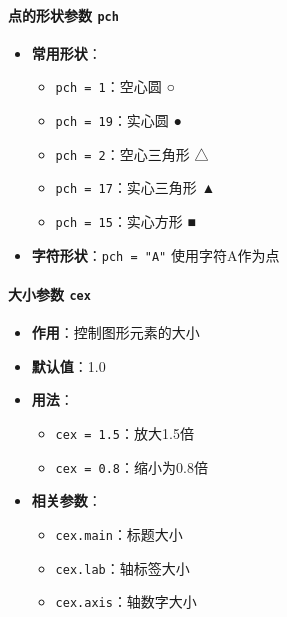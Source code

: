 \documentclass[
]{book}
\providecommand{\tightlist}{%
  \setlength{\itemsep}{0pt}\setlength{\parskip}{0pt}}
\begin{document}
\hypertarget{ux70b9ux7684ux5f62ux72b6ux53c2ux6570-pch}{%
\paragraph{\texorpdfstring{点的形状参数 \texttt{pch}}{点的形状参数 pch}}\label{ux70b9ux7684ux5f62ux72b6ux53c2ux6570-pch}}

\begin{itemize}
\tightlist
\item
  \textbf{常用形状}：

  \begin{itemize}
  \tightlist
  \item
    \texttt{pch\ =\ 1}：空心圆 ○
  \item
    \texttt{pch\ =\ 19}：实心圆 ●
  \item
    \texttt{pch\ =\ 2}：空心三角形 △
  \item
    \texttt{pch\ =\ 17}：实心三角形 ▲
  \item
    \texttt{pch\ =\ 15}：实心方形 ■
  \end{itemize}
\item
  \textbf{字符形状}：\texttt{pch\ =\ "A"} 使用字符A作为点
\end{itemize}

\hypertarget{ux5927ux5c0fux53c2ux6570-cex}{%
\paragraph{\texorpdfstring{大小参数 \texttt{cex}}{大小参数 cex}}\label{ux5927ux5c0fux53c2ux6570-cex}}

\begin{itemize}
\tightlist
\item
  \textbf{作用}：控制图形元素的大小
\item
  \textbf{默认值}：1.0
\item
  \textbf{用法}：

  \begin{itemize}
  \tightlist
  \item
    \texttt{cex\ =\ 1.5}：放大1.5倍
  \item
    \texttt{cex\ =\ 0.8}：缩小为0.8倍
  \end{itemize}
\item
  \textbf{相关参数}：

  \begin{itemize}
  \tightlist
  \item
    \texttt{cex.main}：标题大小
  \item
    \texttt{cex.lab}：轴标签大小
  \item
    \texttt{cex.axis}：轴数字大小
  \end{itemize}
\end{itemize}
\end{document}
